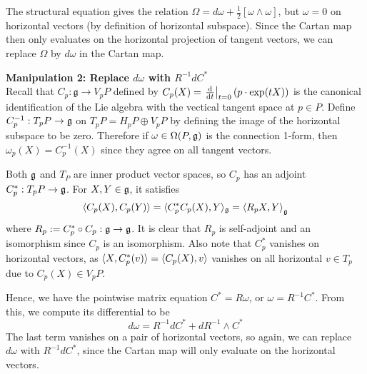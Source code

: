 The structural equation gives the relation
$\Omega = d\omega + \frac{1}{2}[\omega\wedge \omega]$, but $\omega=0$ on
horizontal vectors (by definition of horizontal subspace). Since the Cartan map
then only evaluates on the horizontal projection of tangent vectors, we can 
replace  $\Omega$ by  $d\omega$ in the Cartan map. 

\vspace{1ex}\noindent
\textbf{Manipulation 2: Replace $d\omega$ with  $R^{-1}dC^*$} \\
Recall that $C_p : \mathfrak{g} \to V_pP$ defined by  $C_p(X) = \odv{}{t}_{t=0}
(p\cdot \exp(tX))$ is the canonical identification of the Lie algebra with the
vectical tangent space at $p\in P$. Define $C_p^{-1} : T_pP \to \operatorname{\mathfrak{g}}$ on
$T_pP=H_pP\oplus V_pP$ by
defining the image of the horizontal subspace to be zero. 
Therefore if $\omega\in \Omega(P,\operatorname{\mathfrak{g}})$ is 
the connection 1-form, then $\omega_p(X) = C_p^{-1}(X)$ since they agree on
all tangent vectors. 

Both $\operatorname{\mathfrak{g}}$ and  $T_P$ are inner product vector spaces,
so $C_p$ has an adjoint  $C_p^* : T_pP \to \operatorname{\mathfrak{g}}$. For $X,Y\in \operatorname{\mathfrak{g}}$, it
satisfies 
\[
	\gen{C_p(X), C_p(Y)} = \gen[*]{C_p^*C_p(X),Y}_{\g} = \gen{R_p X, Y}_{\g}
\] 
where $R_p := C_p^*\circ C_p : \operatorname{\mathfrak{g}} \to \operatorname{\mathfrak{g}}$. It is clear that $R_p$ is self-adjoint
and an isomorphism since $C_p$ is an isomorphism. 
Also note that $C_p^*$ vanishes on horizontal vectors, as 
$\gen[*]{X,C_p^*(v)} = \gen{C_p(X),v}$ vanishes on
all horizontal $v\in T_p$ due to $C_p(X)\in V_pP$. 

Hence, we have the
pointwise matrix equation $C^* = R\omega$, or $\omega = R^{-1}C^*$. From this,
we compute its differential to be
\[
d\omega = R^{-1} dC^* + dR^{-1} \wedge C^*
\] 
The last term vanishes on a pair of horizontal vectors, so again, we can replace
$d\omega$ with $R^{-1}dC^*$, since the Cartan map will only evaluate on the
horizontal vectors.


